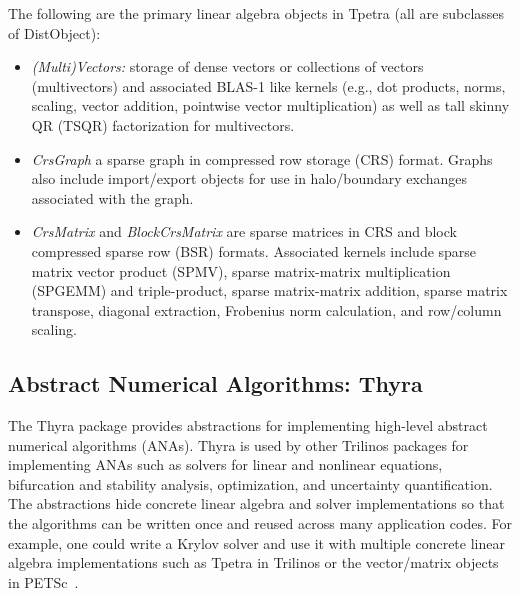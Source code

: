 The following are the primary linear algebra objects in Tpetra (all are subclasses of DistObject):
\begin{itemize}
\item \emph{(Multi)Vectors:} storage of dense vectors or collections of
vectors (multivectors) and associated BLAS-1 like kernels (e.g., dot
products, norms, scaling, vector addition, pointwise vector
multiplication) as well as tall skinny QR (TSQR) factorization for multivectors.
\item \emph{CrsGraph} a sparse graph in compressed row storage (CRS)
format. Graphs also include import/export objects for use in
halo/boundary exchanges associated with the graph.
\item \emph{CrsMatrix} and \emph{BlockCrsMatrix} are sparse matrices in CRS and
block compressed sparse row (BSR) formats. Associated kernels include
sparse matrix vector product (SPMV), sparse matrix-matrix
multiplication (SPGEMM) and triple-product, sparse matrix-matrix addition, sparse matrix transpose, diagonal extraction,
Frobenius norm calculation, and row/column scaling.
\end{itemize}

\subsection{Abstract Numerical Algorithms: Thyra}
The Thyra package provides abstractions for implementing high-level abstract numerical algorithms (ANAs). Thyra is used by other Trilinos packages for implementing ANAs such as solvers for linear and nonlinear equations, bifurcation and stability analysis, optimization, and uncertainty quantification. The abstractions hide concrete linear algebra and solver implementations so that the algorithms can be written once and reused across many application codes. For example, one could write a Krylov solver and use it with multiple concrete linear algebra implementations such as Tpetra in Trilinos %
or the vector/matrix objects in PETSc~\cite{petsc-web-page}.

